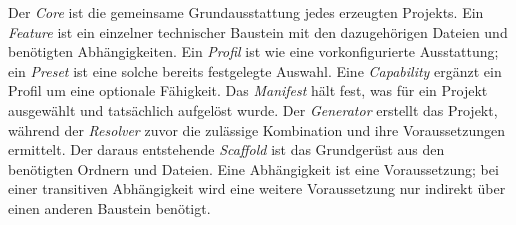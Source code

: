 \begin{beginnerstatement}

Der \emph{Core} ist die gemeinsame Grundausstattung jedes erzeugten Projekts.
Ein \emph{Feature} ist ein einzelner technischer Baustein mit den dazugehörigen
Dateien und benötigten Abhängigkeiten. Ein \emph{Profil} ist wie eine
vorkonfigurierte Ausstattung; ein \emph{Preset} ist eine solche bereits
festgelegte Auswahl. Eine \emph{Capability} ergänzt ein Profil um eine
optionale Fähigkeit. Das \emph{Manifest} hält fest, was für ein Projekt
ausgewählt und tatsächlich aufgelöst wurde. Der \emph{Generator} erstellt das
Projekt, während der \emph{Resolver} zuvor die zulässige Kombination und ihre
Voraussetzungen ermittelt. Der daraus entstehende \emph{Scaffold} ist das
Grundgerüst aus den benötigten Ordnern und Dateien. Eine Abhängigkeit ist eine
Voraussetzung; bei einer transitiven Abhängigkeit wird eine weitere
Voraussetzung nur indirekt über einen anderen Baustein benötigt.

\end{beginnerstatement}
